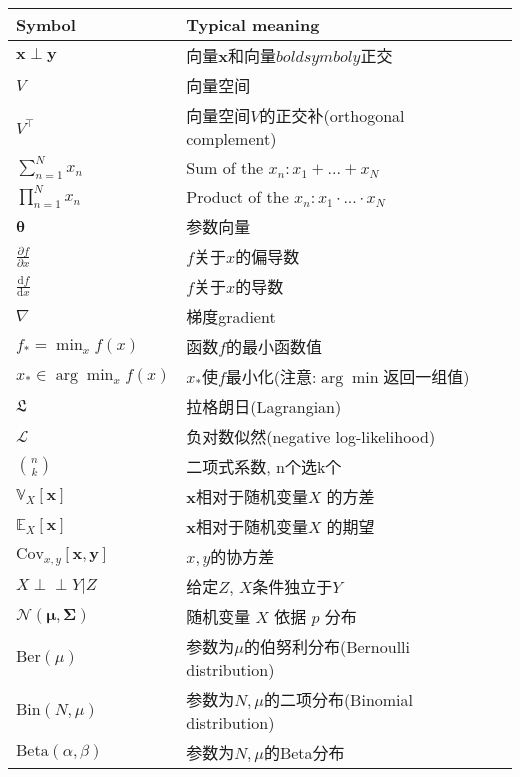 \begin{table}
\begin{tabular}{llp{\textwidth}}
	\hline
	Symbol & Typical meaning \\
	\hline
	\hline
	$ \boldsymbol{x} \perp \boldsymbol{y} $ & 向量$\boldsymbol{x}$和向量$boldsymbol{y}$正交 \\
	$V$ & 向量空间 \\
	$V^\top$ & 向量空间$V$的正交补(orthogonal complement) \\
	$\sum_{n=1}^{N}x_n$ & Sum of the $x_n: x_1 + ... + x_N$ \\
	$\prod_{n=1}^{N}x_n$ & Product of the $x_n: x_1 \cdot ... \cdot x_N$ \\
	$\boldsymbol{\theta}$ & 参数向量 \\
	$ \frac{\partial f}{\partial x} $ & $f$关于$x$的偏导数 \\
	$ \frac{\mathrm{d} f}{\mathrm{d} x} $ & $f$关于$x$的导数 \\
	$ \nabla $ & 梯度{gradient} \\
	$ f_* = \min_x f(x) $ & 函数$f$的最小函数值 \\
	$ x_* \in \arg \min_x f(x) $ & $x_*$使$f$最小化(注意:$\arg \min$返回一组值) \\ 
	$ \mathfrak{L}$ & 拉格朗日(Lagrangian) \\
	$ \mathcal{L}$ & 负对数似然(negative log-likelihood) \\
	$\binom{n}{k}$ & 二项式系数, n个选k个\\
	$\mathbb{V}_X[\boldsymbol{x}]$ & $\boldsymbol{x}$相对于随机变量$X$ 的方差 \\
	$\mathbb{E}_X[\boldsymbol{x}]$ & $\boldsymbol{x}$相对于随机变量$X$ 的期望 \\
	$\mathrm{Cov}_{x,y}[\boldsymbol{x}, \boldsymbol{y}]$ & $x,y$的协方差 \\
	$X \perp \!\!\! \perp Y | Z$ & 给定$Z$, $X$条件独立于$Y$ \\
	$\mathcal{N}(\boldsymbol{\mu}, \boldsymbol{\Sigma})$ & 随机变量 $X$ 依据 $p$ 分布 \\
	$\mathrm{Ber}(\mu)$ & 参数为$\mu$的伯努利分布(Bernoulli distribution) \\
	$\mathrm{Bin}(N, \mu)$ & 参数为$N, \mu$的二项分布(Binomial distribution) \\
	$\mathrm{Beta}(\alpha, \beta)$ & 参数为$N, \mu$的Beta分布 \\
	\hline
\end{tabular}
\end{table}

